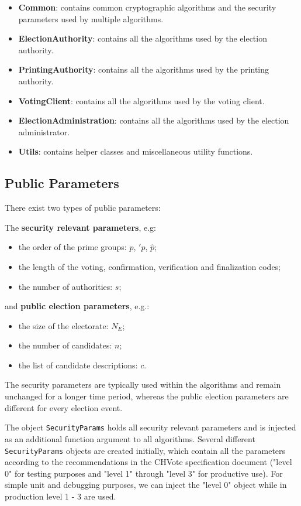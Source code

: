 \begin{itemize}
	\item \textbf{Common}: contains common cryptographic algorithms and the security parameters used by multiple algorithms.
	\item \textbf{ElectionAuthority}: contains all the algorithms used by the election authority.
	\item \textbf{PrintingAuthority}: contains all the algorithms used by the printing authority.
	\item \textbf{VotingClient}: contains all the algorithms used by the voting client.
	\item \textbf{ElectionAdministration}: contains all the algorithms used by the election administrator.
	\item \textbf{Utils}: contains helper classes and miscellaneous utility functions.
\end{itemize}

\subsection{Public Parameters}
There exist two types of public parameters:

The \textbf{security relevant parameters}, e.g:

\begin{itemize}
	\item the order of the prime groups: $p$, $\prime{p}$, $\hat{p}$;
	\item the length of the voting, confirmation, verification and finalization codes;
	\item the number of authorities: $s$;
\end{itemize}

and \textbf{public election parameters}, e.g.:

\begin{itemize}
	\item the size of the electorate: $N_E$;
	\item the number of candidates: $n$;
	\item the list of candidate descriptions: $c$.
\end{itemize}

The security parameters are typically used within the algorithms and remain unchanged for a longer time period, whereas the public election parameters are different for every election event.

The object \texttt{SecurityParams} holds all security relevant parameters and is injected as an additional function argument to all algorithms. Several different \texttt{SecurityParams} objects are created initially, which contain all the parameters according to the recommendations in the CHVote specification document ("level 0" for testing purposes and "level 1" through "level 3" for productive use). For simple unit and debugging purposes, we can inject the "level 0" object while in production level 1 - 3 are used.

